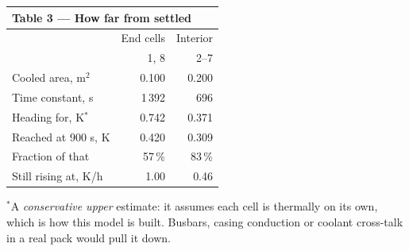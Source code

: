 \documentclass[9pt,a4paper]{article}
\renewcommand{\tiny}{\fontsize{5.6}{6.1}\selectfont}
\begin{document}
\begin{minipage}[t]{0.315\textwidth}
{\fontsize{6.8}{7.9}\selectfont
\begin{tabular}{l r r}
\multicolumn{3}{l}{\textbf{Table 3 --- How far from settled}}\\
\toprule
 & End cells & Interior \\
 & 1, 8 & 2--7 \\
\midrule
Cooled area, m$^2$      & 0.100  & 0.200 \\
Time constant, s        & 1\,392 & 696 \\
Heading for, K$^{*}$    & 0.742  & 0.371 \\
Reached at 900 s, K     & 0.420  & 0.309 \\
Fraction of that        & 57\,\% & 83\,\% \\
Still rising at, K/h    & 1.00   & 0.46 \\
\bottomrule
\end{tabular}}

\vspace{0.5mm}
{\tiny $^{*}$A \emph{conservative upper} estimate: it assumes each cell is
thermally on its own, which is how this model is built. Busbars, casing
conduction or coolant cross-talk in a real pack would pull it down.}
\end{minipage}
\end{document}

